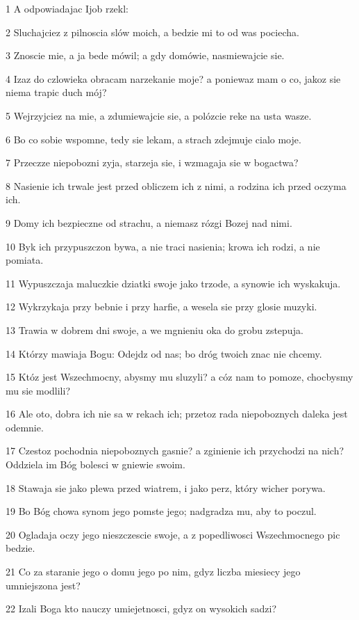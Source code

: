 \par 1 A odpowiadajac Ijob rzekl:
\par 2 Sluchajciez z pilnoscia slów moich, a bedzie mi to od was pociecha.
\par 3 Znoscie mie, a ja bede mówil; a gdy domówie, nasmiewajcie sie.
\par 4 Izaz do czlowieka obracam narzekanie moje? a poniewaz mam o co, jakoz sie niema trapic duch mój?
\par 5 Wejrzyjciez na mie, a zdumiewajcie sie, a polózcie reke na usta wasze.
\par 6 Bo co sobie wspomne, tedy sie lekam, a strach zdejmuje cialo moje.
\par 7 Przeczze niepobozni zyja, starzeja sie, i wzmagaja sie w bogactwa?
\par 8 Nasienie ich trwale jest przed obliczem ich z nimi, a rodzina ich przed oczyma ich.
\par 9 Domy ich bezpieczne od strachu, a niemasz rózgi Bozej nad nimi.
\par 10 Byk ich przypuszczon bywa, a nie traci nasienia; krowa ich rodzi, a nie pomiata.
\par 11 Wypuszczaja maluczkie dziatki swoje jako trzode, a synowie ich wyskakuja.
\par 12 Wykrzykaja przy bebnie i przy harfie, a wesela sie przy glosie muzyki.
\par 13 Trawia w dobrem dni swoje, a we mgnieniu oka do grobu zstepuja.
\par 14 Którzy mawiaja Bogu: Odejdz od nas; bo dróg twoich znac nie chcemy.
\par 15 Któz jest Wszechmocny, abysmy mu sluzyli? a cóz nam to pomoze, chocbysmy mu sie modlili?
\par 16 Ale oto, dobra ich nie sa w rekach ich; przetoz rada niepoboznych daleka jest odemnie.
\par 17 Czestoz pochodnia niepoboznych gasnie? a zginienie ich przychodzi na nich? Oddziela im Bóg bolesci w gniewie swoim.
\par 18 Stawaja sie jako plewa przed wiatrem, i jako perz, który wicher porywa.
\par 19 Bo Bóg chowa synom jego pomste jego; nadgradza mu, aby to poczul.
\par 20 Ogladaja oczy jego nieszczescie swoje, a z popedliwosci Wszechmocnego pic bedzie.
\par 21 Co za staranie jego o domu jego po nim, gdyz liczba miesiecy jego umniejszona jest?
\par 22 Izali Boga kto nauczy umiejetnosci, gdyz on wysokich sadzi?
